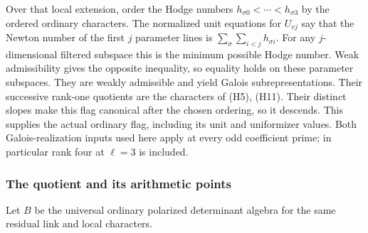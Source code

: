 Over that local extension, order the Hodge numbers
\(h_{\sigma0}<\cdots<h_{\sigma3}\) by the ordered ordinary
characters. The normalized unit equations for \(U_{vj}\)
say that the Newton number of the first \(j\) parameter
lines is
\(\sum_\sigma\sum_{i<j}h_{\sigma i}\).
For any \(j\)-dimensional filtered subspace this is the
minimum possible Hodge number.
Weak admissibility gives the opposite inequality, so
equality holds on these parameter subspaces.
They are weakly admissible and yield Galois subrepresentations.
Their successive rank-one quotients are the characters
of (H5), (H11).
Their distinct slopes make this flag canonical after the
chosen ordering, so it descends.
This supplies the actual ordinary flag, including its
unit and uniformizer values.
Both Galois-realization inputs used here apply at every
odd coefficient prime; in particular rank four at
\(\ell=3\) is included.
\subsubsection{The quotient and its arithmetic points}
Let \(B\) be the universal ordinary polarized determinant
algebra for the same residual link and local characters.

